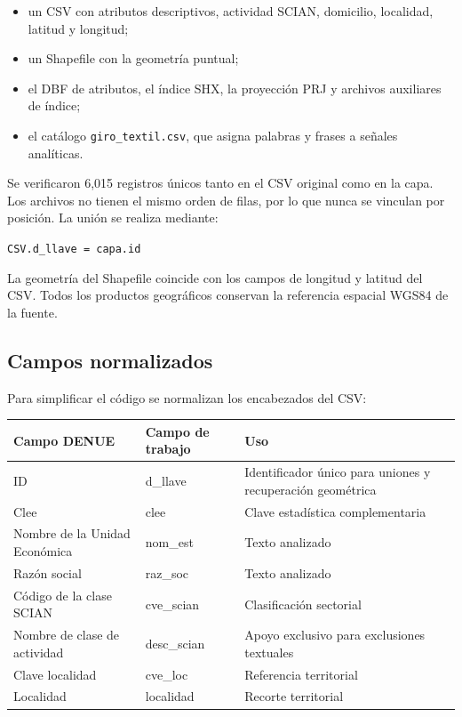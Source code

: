 \documentclass[11pt,letterpaper]{article}
\begin{document}
\begin{itemize}
  \item un CSV con atributos descriptivos, actividad SCIAN, domicilio, localidad, latitud y longitud;
  \item un Shapefile con la geometría puntual;
  \item el DBF de atributos, el índice SHX, la proyección PRJ y archivos auxiliares de índice;
  \item el catálogo \texttt{giro\_textil.csv}, que asigna palabras y frases a señales analíticas.
\end{itemize}

Se verificaron 6,015 registros únicos tanto en el CSV original como en la capa. Los archivos no tienen el mismo orden de filas, por lo que nunca se vinculan por posición. La unión se realiza mediante:

\begin{center}
\texttt{CSV.d\_llave = capa.id}
\end{center}

La geometría del Shapefile coincide con los campos de longitud y latitud del CSV. Todos los productos geográficos conservan la referencia espacial WGS84 de la fuente.

\subsection{Campos normalizados}

Para simplificar el código se normalizan los encabezados del CSV:

\begin{longtable}{>{\ttfamily}p{}>{\ttfamily}p{}p{}}
\toprule
Campo DENUE & Campo de trabajo & Uso\\
\midrule
\endhead
ID & d\_llave & Identificador único para uniones y recuperación geométrica\\
Clee & clee & Clave estadística complementaria\\
Nombre de la Unidad Económica & nom\_est & Texto analizado\\
Razón social & raz\_soc & Texto analizado\\
Código de la clase SCIAN & cve\_scian & Clasificación sectorial\\
Nombre de clase de actividad & desc\_scian & Apoyo exclusivo para exclusiones textuales\\
Clave localidad & cve\_loc & Referencia territorial\\
Localidad & localidad & Recorte territorial\\
\bottomrule
\end{longtable}
\end{document}
